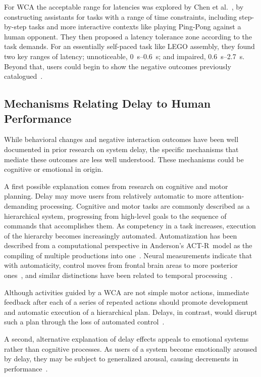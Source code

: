 For WCA the acceptable range for latencies was explored by Chen et al.~\cite{Chen:AnEmpiricalStudyOfLatency}, by constructing assistants for tasks with a range of time constraints, including step-by-step tasks and more interactive contexts like playing Ping-Pong against a human opponent.
They then proposed a latency tolerance zone according to the task demands.
For an essentially self-paced task like LEGO assembly, they found two key ranges of latency; unnoticeable, \SIrange{0}{0.6}{\second}; and impaired, \SIrange{0.6}{2.7}{\second}. 
Beyond that, users could begin to show the negative outcomes previously catalogued~\cite{dabrowsky:2011:40years}.


\subsection{Mechanisms Relating Delay to Human Performance}\label{ssec:potentialmechs}

While behavioral changes and negative interaction outcomes have been well documented in prior research on system delay, the specific mechanisms that mediate these outcomes are less well understood. 
These mechanisms could be cognitive or emotional in origin.

A first possible explanation comes from research on cognitive and motor planning. 
Delay may move users from relatively automatic to more attention-demanding processing.
Cognitive and motor tasks are commonly described as a hierarchical system, progressing from high-level goals to the sequence of commands that accomplishes them.
As competency in a task increases, execution of the hierarchy becomes increasingly automated.
Automatization has been described from a computational perspective in {Anderson's ACT-R}~model as the compiling of multiple productions into one~\cite{neves1981knowledge}.
Neural measurements indicate that with automaticity, control moves from frontal brain areas to more posterior ones~\cite{jeon2015degree,puttemans2005changes}, and similar distinctions have been related to temporal processing~\cite{lewis2003distinct,koch2009neural,lee2019limiting}.

Although activities guided by a WCA are not simple motor actions, immediate feedback after each of a series of repeated actions should promote development and automatic execution of a hierarchical plan.
Delays, in contrast, would disrupt such a plan through the loss of automated control~\cite{lee2019limiting}.

A second, alternative explanation of delay effects appeals to emotional systems rather than cognitive processes.
As users of a system become emotionally aroused by delay, they may be subject to generalized arousal, causing decrements in performance~\cite{lee2019limiting}.

